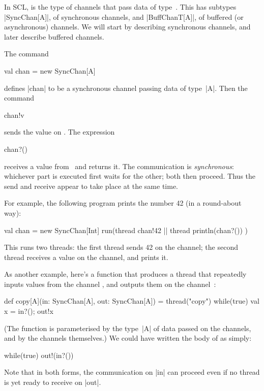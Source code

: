 

In SCL,  is the type of channels that pass data of
type~.  This has  subtypes |SyncChan[A]|, of synchronous
channels, and |BuffChanT[A]|, of buffered (or asynchronous) channels.  We will
start by describing synchronous channels, and later describe buffered
channels. 

The command
\begin{scala}
  val chan = new SyncChan[A]
\end{scala}
defines |chan| to be a synchronous channel passing data of type~|A|.  Then the
command 
\begin{scala}
  chan!v
\end{scala}
sends the value  on .  The expression
\begin{scala}
  chan?()
\end{scala}
receives a value from~ and returns it.  The communication is
\emph{synchronous}: whichever part is executed first waits for the other; both
then proceed.  Thus the send and receive appear to take place at the same
time.  


For example, the following program prints the number 42 (in a round-about
way): 
\begin{scala}
  val chan = new SyncChan[Int]
  run(thread{ chan!42 } || thread{ println(chan?()) }) 
\end{scala}
%
This runs two threads: the first thread sends 42 on the channel; the second
thread receives a value on the channel, and prints it.


As another example, here's a function that produces a thread that repeatedly
inputs values from the channel , and outputs them on the
channel~:
%
\begin{scala}
  def copy[A](in: SyncChan[A], out: SyncChan[A]) = thread("copy"){
    while(true){ val x = in?(); out!x }
  }
\end{scala}
%
(The function is parameterised by the type~|A| of data passed on the channels,
and by the channels themselves.)
%
We could have written the body of  as simply:
\begin{scala}
  while(true) out!(in?()) 
\end{scala}
Note that in both forms, the communication on |in| can proceed even if no
thread is yet ready to receive on |out|.

